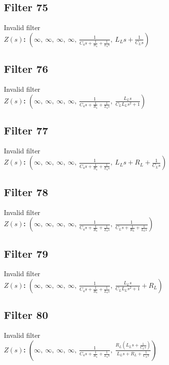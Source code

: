 \documentclass{article}
\begin{document}
\subsection*{Filter 75}
Invalid filter \\ 
\textbf{$Z(s)$:} $\left( \infty, \  \infty, \  \infty, \  \infty, \  \frac{1}{C_{4} s + \frac{1}{R_{4}} + \frac{1}{L_{4} s}}, \  L_{L} s + \frac{1}{C_{L} s}\right)$ \\ 
\subsection*{Filter 76}
Invalid filter \\ 
\textbf{$Z(s)$:} $\left( \infty, \  \infty, \  \infty, \  \infty, \  \frac{1}{C_{4} s + \frac{1}{R_{4}} + \frac{1}{L_{4} s}}, \  \frac{L_{L} s}{C_{L} L_{L} s^{2} + 1}\right)$ \\ 
\subsection*{Filter 77}
Invalid filter \\ 
\textbf{$Z(s)$:} $\left( \infty, \  \infty, \  \infty, \  \infty, \  \frac{1}{C_{4} s + \frac{1}{R_{4}} + \frac{1}{L_{4} s}}, \  L_{L} s + R_{L} + \frac{1}{C_{L} s}\right)$ \\ 
\subsection*{Filter 78}
Invalid filter \\ 
\textbf{$Z(s)$:} $\left( \infty, \  \infty, \  \infty, \  \infty, \  \frac{1}{C_{4} s + \frac{1}{R_{4}} + \frac{1}{L_{4} s}}, \  \frac{1}{C_{L} s + \frac{1}{R_{L}} + \frac{1}{L_{L} s}}\right)$ \\ 
\subsection*{Filter 79}
Invalid filter \\ 
\textbf{$Z(s)$:} $\left( \infty, \  \infty, \  \infty, \  \infty, \  \frac{1}{C_{4} s + \frac{1}{R_{4}} + \frac{1}{L_{4} s}}, \  \frac{L_{L} s}{C_{L} L_{L} s^{2} + 1} + R_{L}\right)$ \\ 
\subsection*{Filter 80}
Invalid filter \\ 
\textbf{$Z(s)$:} $\left( \infty, \  \infty, \  \infty, \  \infty, \  \frac{1}{C_{4} s + \frac{1}{R_{4}} + \frac{1}{L_{4} s}}, \  \frac{R_{L} \left(L_{L} s + \frac{1}{C_{L} s}\right)}{L_{L} s + R_{L} + \frac{1}{C_{L} s}}\right)$ \\ 
\end{document}
